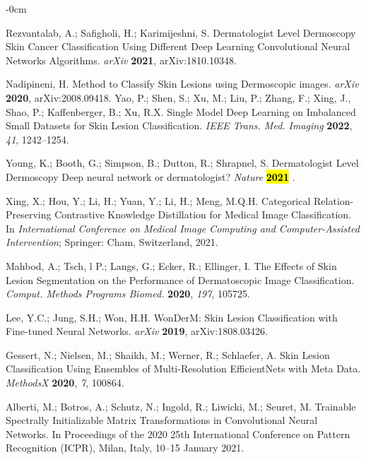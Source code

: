 \documentclass[sensors,article,accept,pdftex,moreauthors]{Definitions/mdpi}
\begin{document}
\begin{adjustwidth}{-\extralength}{0cm}
\begin{thebibliography}{999}
Rezvantalab, A.; Safigholi, H.; Karimijeshni, S. Dermatologist Level Dermoscopy Skin Cancer Classification Using Different Deep Learning Convolutional Neural Networks Algorithms. 
{\em arXiv} 
{\bf 2021}, arXiv:1810.10348.		

Nadipineni, H. Method to Classify Skin Lesions using Dermoscopic images. {\em arXiv} 
{\bf 2020}, arXiv:2008.09418.		
Yao, P.; Shen, S.; Xu, M.; Liu, P.; Zhang, F.;  Xing, J., Shao, P.; Kaffenberger, B.; Xu, R.X. 
Single Model Deep Learning on Imbalanced Small Datasets for Skin Lesion Classification. 
{\em IEEE Trans. Med. Imaging} 
{\bf 2022}, \emph{41}, 1242--1254.
		
Young, K.; Booth, G.; Simpson, B.; Dutton, R.; Shrapnel, S.  Dermatologist Level Dermoscopy Deep neural network or dermatologist? {\em Nature} 
{\bf \hl{2021} %
}.
		
Xing, X.; Hou, Y.; Li, H.; Yuan, Y.; Li, H.; Meng, M.Q.H.
  Categorical Relation-Preserving Contrastive Knowledge Distillation for Medical Image Classification. 
In  \emph{International Conference on Medical Image Computing and Computer-Assisted Intervention}; Springer: Cham, Switzerland, 
{2021}.
		

Mahbod, A.; Tsch, l P.; Langs, G.; Ecker, R.; Ellinger, I.  The Effects of Skin Lesion Segmentation on the Performance of Dermatoscopic Image Classification.
{\em Comput. Methods Programs Biomed.} 
{\bf 2020}, \emph{197}, 105725.

Lee, Y.C.; Jung, S.H.; Won, H.H. WonDerM: Skin Lesion Classification with Fine-tuned Neural Networks.
{\em arXiv} 
{\bf 2019}, arXiv:1808.03426.

Gessert, N.; Nielsen, M.; Shaikh, M.; Werner, R.; Schlaefer, A. Skin Lesion Classification Using Ensembles of Multi-Resolution EfficientNets with Meta Data. 
{\em MethodsX} 
{\bf 2020}, \emph{7}, 100864.		

Alberti, M.; Botros, A.; Schutz, N.; Ingold, R.; Liwicki, M.; Seuret, M. Trainable Spectrally Initializable Matrix Transformations in Convolutional Neural Networks. In Proceedings of the 2020 25th International Conference on Pattern Recognition (ICPR), Milan, Italy, 10--15 January 2021.
		

\end{thebibliography}
\end{adjustwidth}
\end{document}
